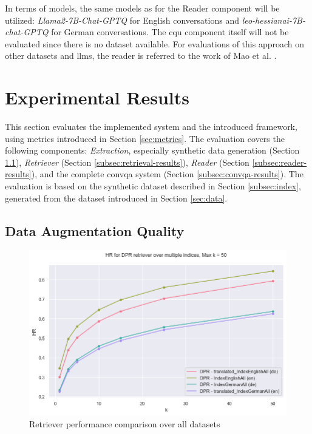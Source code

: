 In terms of models, the same models as for the Reader component will be utilized: \textit{Llama2-7B-Chat-GPTQ} for English conversations and \textit{leo-hessianai-7B-chat-GPTQ} for German conversations. The \gls{cqu} component itself will not be evaluated since there is no dataset available. For evaluations of this approach on other datasets and \gls{llm}s, the reader is referred to the work of Mao et al. \cite{mao_large_2023}.

\section{Experimental Results}
\label{sec:results}

This section evaluates the implemented system and the introduced framework, using metrics introduced in Section \ref{sec:metrics}. The evaluation covers the following components: \textit{Extraction}, especially synthetic data generation (Section \ref{subsec:data-augmentation-quality}), \textit{Retriever} (Section \ref{subsec:retrieval-results}), \textit{Reader} (Section \ref{subsec:reader-results}), and the complete \gls{convqa} system (Section \ref{subsec:convqa-results}). The evaluation is based on the synthetic dataset described in Section \ref{subsec:index}, generated from the dataset introduced in Section \ref{sec:data}.

\subsection{Data Augmentation Quality}
\label{subsec:data-augmentation-quality}

\begin{figure}
    \centering
    \includegraphics[width=\textwidth]{Grafiken/Evaluation/Data_Generation/hr_dpr_all_400.png}
    \caption{Retriever performance comparison over all datasets}
    \label{fig:synthetic-data-generation-performance-comparison}
\end{figure}


